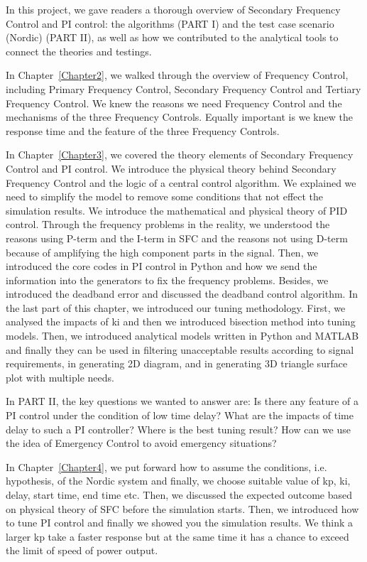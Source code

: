 In this project, we gave readers a thorough overview of Secondary Frequency Control and PI control: the algorithms (PART I) and the test case scenario (Nordic) (PART II), as well as how we contributed to the analytical tools to connect the theories and testings. 

In Chapter~\ref{Chapter2}, we walked through the overview of Frequency Control, including Primary Frequency Control, Secondary Frequency Control and Tertiary Frequency Control. We knew the reasons we need Frequency Control and the mechanisms of the three Frequency Controls. Equally important is we knew the response time and the feature of the three Frequency Controls. 

In Chapter~\ref{Chapter3}, we covered the theory elements of Secondary Frequency Control and PI control. We introduce the physical theory behind Secondary Frequency Control and the logic of a central control algorithm. We explained we need to simplify the model to remove some conditions that not effect the simulation results. We introduce the mathematical and physical theory of PID control. Through the frequency problems in the reality, we understood the reasons using P-term and the I-term in SFC and the reasons not using D-term because of amplifying the high component parts in the signal. Then, we introduced the core codes in PI control in Python and how we send the information into the generators to fix the frequency problems. Besides, we introduced the deadband error and discussed the deadband control algorithm. In the last part of this chapter, we introduced our tuning methodology. First, we analysed the impacts of ki and then we introduced bisection method into tuning models. Then, we introduced analytical models written in Python and MATLAB and finally they can be used in filtering unacceptable results according to signal requirements, in generating 2D diagram, and in generating 3D triangle surface plot with multiple needs. 

In PART II, the key questions we wanted to answer are: Is there any feature of a PI control under the condition of low time delay? What are the impacts of time delay to such a PI controller? Where is the best tuning result? How can we use the idea of Emergency Control to avoid emergency situations? 

In Chapter~\ref{Chapter4}, we put forward how to assume the conditions, i.e. hypothesis, of the Nordic system and finally, we choose suitable value of kp, ki, delay, start time, end time etc. Then, we discussed the expected outcome based on physical theory of SFC before the simulation starts. Then, we introduced how to tune PI control and finally we showed you the simulation results. We think a larger kp take a faster response but at the same time it has a chance to exceed the limit of speed of power output. 

